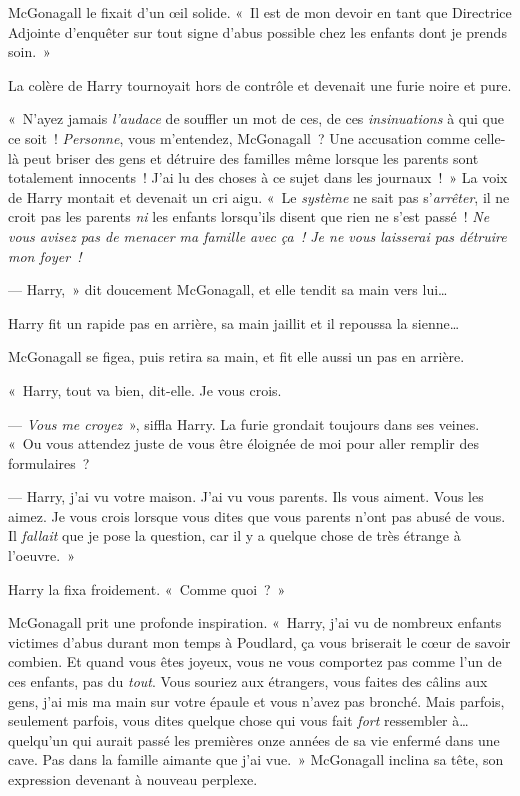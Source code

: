 McGonagall le fixait d'un œil solide. «~Il est de mon devoir en tant que Directrice Adjointe d'enquêter sur tout signe d'abus possible chez les enfants dont je prends soin.~»

La colère de Harry tournoyait hors de contrôle et devenait une furie noire et pure.

«~N'ayez jamais \emph{l'audace} de souffler un mot de ces, de ces \emph{insinuations} à qui que ce soit~! \emph{Personne}, vous m'entendez, McGonagall~? Une accusation comme celle-là peut briser des gens et détruire des familles même lorsque les parents sont totalement innocents~! J'ai lu des choses à ce sujet dans les journaux~!~» La voix de Harry montait et devenait un cri aigu. «~Le \emph{système} ne sait pas s'\emph{arrêter}, il ne croit pas les parents \emph{ni} les enfants lorsqu'ils disent que rien ne s'est passé~! \emph{Ne vous avisez pas de menacer ma famille avec ça~! Je ne vous laisserai pas détruire mon foyer~!}

--- Harry,~» dit doucement McGonagall, et elle tendit sa main vers lui…

Harry fit un rapide pas en arrière, sa main jaillit et il repoussa la sienne…

McGonagall se figea, puis retira sa main, et fit elle aussi un pas en arrière.

«~Harry, tout va bien, dit-elle. Je vous crois.

--- \emph{Vous me croyez}~», siffla Harry. La furie grondait toujours dans ses veines. «~Ou vous attendez juste de vous être éloignée de moi pour aller remplir des formulaires~?

--- Harry, j'ai vu votre maison. J'ai vu vous parents. Ils vous aiment. Vous les aimez. Je vous crois lorsque vous dites que vous parents n'ont pas abusé de vous. Il \emph{fallait} que je pose la question, car il y a quelque chose de très étrange à l'oeuvre.~»

Harry la fixa froidement. «~Comme quoi~?~»

McGonagall prit une profonde inspiration. «~Harry, j'ai vu de nombreux enfants victimes d'abus durant mon temps à Poudlard, ça vous briserait le cœur de savoir combien. Et quand vous êtes joyeux, vous ne vous comportez pas comme l'un de ces enfants, pas du \emph{tout}. Vous souriez aux étrangers, vous faites des câlins aux gens, j'ai mis ma main sur votre épaule et vous n'avez pas bronché. Mais parfois, seulement parfois, vous dites quelque chose qui vous fait \emph{fort} ressembler à… quelqu'un qui aurait passé les premières onze années de sa vie enfermé dans une cave. Pas dans la famille aimante que j'ai vue.~» McGonagall inclina sa tête, son expression devenant à nouveau perplexe.

